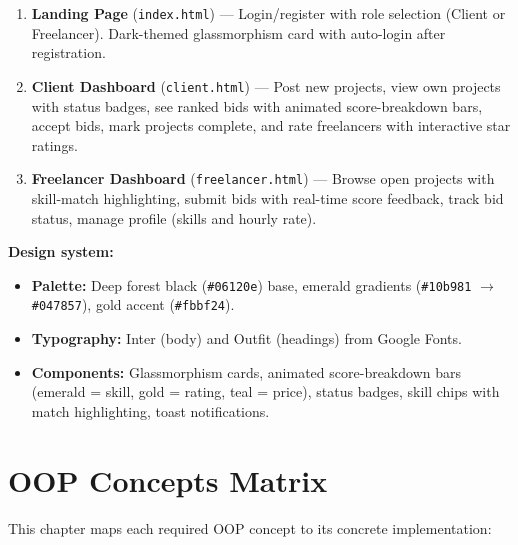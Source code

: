 \documentclass[12pt, a4paper]{report}
\begin{document}
\begin{enumerate}
  \item \textbf{Landing Page} (\texttt{index.html}) --- Login/register with role selection (Client or Freelancer). Dark-themed glassmorphism card with auto-login after registration.
  \item \textbf{Client Dashboard} (\texttt{client.html}) --- Post new projects, view own projects with status badges, see ranked bids with animated score-breakdown bars, accept bids, mark projects complete, and rate freelancers with interactive star ratings.
  \item \textbf{Freelancer Dashboard} (\texttt{freelancer.html}) --- Browse open projects with skill-match highlighting, submit bids with real-time score feedback, track bid status, manage profile (skills and hourly rate).
\end{enumerate}

\textbf{Design system:}
\begin{itemize}
  \item \textbf{Palette:} Deep forest black (\texttt{\#06120e}) base, emerald gradients (\texttt{\#10b981} $\to$ \texttt{\#047857}), gold accent (\texttt{\#fbbf24}).
  \item \textbf{Typography:} Inter (body) and Outfit (headings) from Google Fonts.
  \item \textbf{Components:} Glassmorphism cards, animated score-breakdown bars (emerald = skill, gold = rating, teal = price), status badges, skill chips with match highlighting, toast notifications.
\end{itemize}

\chapter{OOP Concepts Matrix}

This chapter maps each required OOP concept to its concrete implementation:
\end{document}
